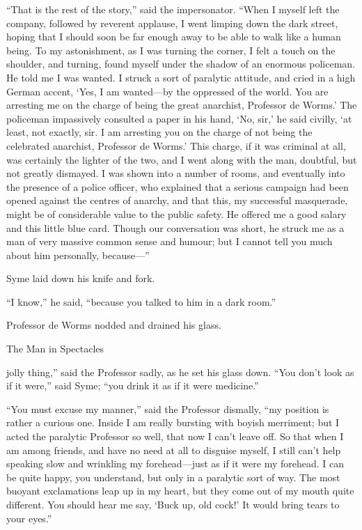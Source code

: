 “That is the rest of the story,” said the impersonator. “When I myself left the company, followed by reverent applause, I went limping down the dark street, hoping that I should soon be far enough away to be able to walk like a human being. To my astonishment, as I was turning the corner, I felt a touch on the shoulder, and turning, found myself under the shadow of an enormous policeman. He told me I was wanted. I struck a sort of paralytic attitude, and cried in a high German accent, ‘Yes, I am wanted⁠—by the oppressed of the world. You are arresting me on the charge of being the great anarchist, Professor de Worms.’ The policeman impassively consulted a paper in his hand, ‘No, sir,’ he said civilly, ‘at least, not exactly, sir. I am arresting you on the charge of not being the celebrated anarchist, Professor de Worms.’ This charge, if it was criminal at all, was certainly the lighter of the two, and I went along with the man, doubtful, but not greatly dismayed. I was shown into a number of rooms, and eventually into the presence of a police officer, who explained that a serious campaign had been opened against the centres of anarchy, and that this, my successful masquerade, might be of considerable value to the public safety. He offered me a good salary and this little blue card. Though our conversation was short, he struck me as a man of very massive common sense and humour; but I cannot tell you much about him personally, because⁠—”

Syme laid down his knife and fork.

“I know,” he said, “because you talked to him in a dark room.”

Professor de Worms nodded and drained his glass.

\chap[manin] The Man in Spectacles

 jolly thing,” said the Professor sadly, as he set his glass down.
\nl
“You don’t look as if it were,” said Syme; “you drink it as if it were medicine.”

“You must excuse my manner,” said the Professor dismally, “my position is rather a curious one. Inside I am really bursting with boyish merriment; but I acted the paralytic Professor so well, that now I can’t leave off. So that when I am among friends, and have no need at all to disguise myself, I still can’t help speaking slow and wrinkling my forehead⁠—just as if it were my forehead. I can be quite happy, you understand, but only in a paralytic sort of way. The most buoyant exclamations leap up in my heart, but they come out of my mouth quite different. You should hear me say, ‘Buck up, old cock!’ It would bring tears to your eyes.”

